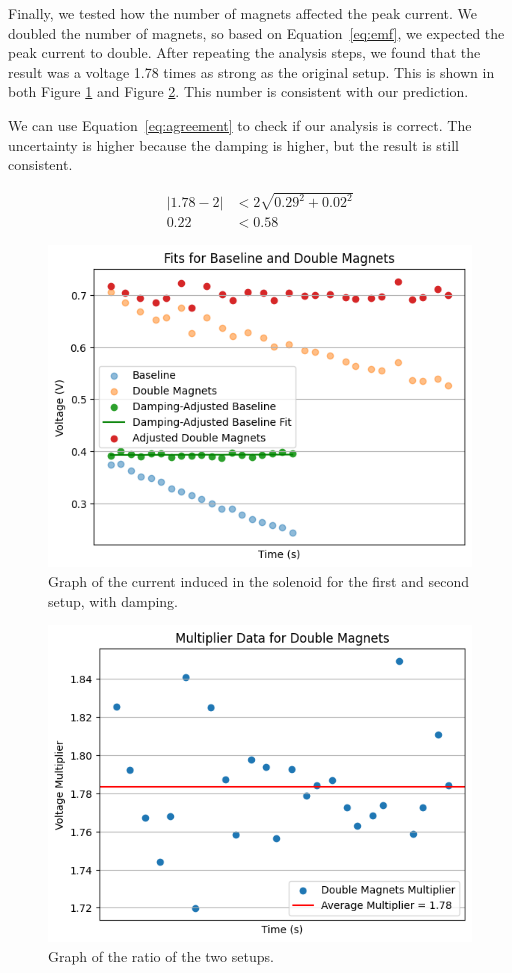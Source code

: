 \documentclass[11pt]{article}
\begin{document}
    Finally, we tested how the number of magnets affected the peak current.
    We doubled the number of magnets, so based on Equation~\ref{eq:emf}, we expected the peak current to double.
    After repeating the analysis steps, we found that the result was a voltage 1.78 times as strong as the original setup.
    This is shown in both Figure \ref{fig:part1c_damping} and Figure \ref{fig:part1c_ratios}.
    This number is consistent with our prediction.

    We can use Equation~\ref{eq:agreement} to check if our analysis is correct.
    The uncertainty is higher because the damping is higher, but the result is still consistent.

    \begin{align*}
        |1.78 - 2| &< 2 \sqrt{0.29^2 + 0.02^2} \\
        0.22 &< 0.58
    \end{align*}

    \begin{figure}[H]
        \centering
        \includegraphics[width=0.8\linewidth]{resources/images/part1c damping}
        \caption{Graph of the current induced in the solenoid for the first and second setup, with damping.}
        \label{fig:part1c_damping}
    \end{figure}

    \begin{figure}[H]
        \centering
        \includegraphics[width=0.8\linewidth]{resources/images/part1c ratios}
        \caption{Graph of the ratio of the two setups.}
        \label{fig:part1c_ratios}
    \end{figure}
\end{document}
